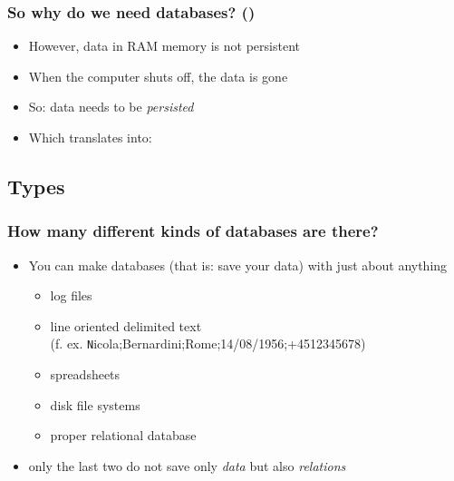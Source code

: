 \documentclass[\printmode,compress,xcolor=dvipsnames]{beamer}
\begin{document}
\begin{frame}
  \frametitle<+->{So why do we need databases? ()}

  \begin{itemize}[<+- | alert@+->]

     \item However, data in RAM memory is not persistent

     \item When the computer shuts off, the data is gone

     \item So: data needs to be \emph{persisted}

     \item Which translates into: 

  \end{itemize}

\end{frame}

\subsection{Types}

\setcounter{ms}{0}
\begin{frame}
  \frametitle<+->{How many different kinds of databases are there?}

  \begin{itemize}[<+- | alert@+->]

    \item You can make databases (that is: save your data) with just about
          anything

          \begin{itemize}[<+- | alert@+->]

            \item log files

            \item line oriented delimited text\\
                    (f. ex. {\texttt Nicola;Bernardini;Rome;14/08/1956;+4512345678})

            \item spreadsheets

            \item disk file systems

            \item proper relational database

          \end{itemize}

    \item only the last two do not save only \emph{data} but also \emph{relations}

  \end{itemize}

\end{frame}
\end{document}
